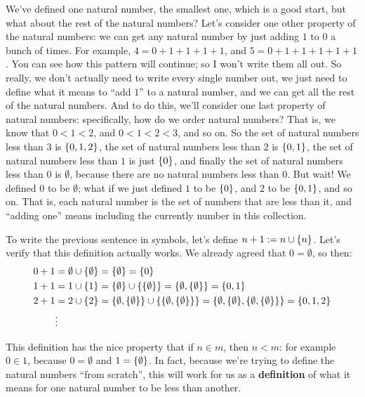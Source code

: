 We've defined one natural number, the smallest one, which is a good start, but what about the rest of the natural numbers?
Let's consider one other property of the natural numbers: we can get any natural number by just adding $1$ to $0$ a bunch of times.
For example, $4 = 0 + 1 + 1 + 1 + 1$, and $5 = 0 + 1 + 1 + 1 + 1 + 1$.
You can see how this pattern will continue; so I won't write them all out.
So really, we don't actually need to write every single number out, we just need to define what it means to ``add $1$'' to a natural number, and we can get all the rest of the natural numbers.
And to do this, we'll consider one last property of natural numbers: specifically, how do we order natural numbers?
That is, we know that $0 < 1 < 2$, and $0 < 1 < 2 < 3$, and so on.
So the set of natural numbers less than $3$ is ${\left\{ {0,1,2} \right\}}$, the set of natural numbers less than $2$ is ${\left\{ {0,1} \right\}}$, the set of natural numbers less than $1$ is just ${\left\{ {0} \right\}}$, and finally the set of natural numbers less than $0$ is $\emptyset$, because there are no natural numbers less than $0$.
But wait!
We defined $0$ to be $\emptyset$; what if we just defined $1$ to be ${\left\{ {0} \right\}}$, and $2$ to be ${\left\{ {0,1} \right\}}$, and so on.
That is, each natural number is the set of numbers that are less than it, and ``adding one'' means including the currently number in this collection.

To write the previous sentence in symbols, let's define $n + 1 := n \cup {\left\{ {n} \right\}}$.
Let's verify that this definition actually works.
We already agreed that $0 = \emptyset$, so then:
\begin{align*}
    0 + 1 &= \emptyset \cup {\left\{ {\emptyset} \right\}} = {\left\{ {\emptyset} \right\}} = {\left\{ {0} \right\}} \\
    1 + 1 &= 1 \cup {\left\{ {1} \right\}} = {\left\{ {\emptyset} \right\}} \cup {\left\{ {\ensuremath{{\left\{ {\emptyset} \right\}}}} \right\}} = {\left\{ {\emptyset, {\left\{ {\emptyset} \right\}}} \right\}} = {\left\{ {0, 1} \right\}} \\
    2 + 1 &= 2 \cup {\left\{ {2} \right\}} = {\left\{ {\emptyset, {\left\{ {\emptyset} \right\}}} \right\}} \cup {\left\{ {\ensuremath{{\left\{ {\emptyset, {\left\{ {\emptyset} \right\}}} \right\}}}} \right\}} = {\left\{ {\emptyset, {\left\{ {\emptyset} \right\}}, {\left\{ {\emptyset, {\left\{ {\emptyset} \right\}}} \right\}}} \right\}} = {\left\{ {0, 1, 2} \right\}} \\
    &\vdots
\end{align*}

This definition has the nice property that if $n \in m$, then $n < m$: for example $0 \in 1$, because $0 = \emptyset$ and $1 = {\left\{ {\emptyset} \right\}}$.
In fact, because we're trying to define the natural numbers ``from scratch'', this will work for us as a \textbf{definition} of what it means for one natural number to be less than another.

